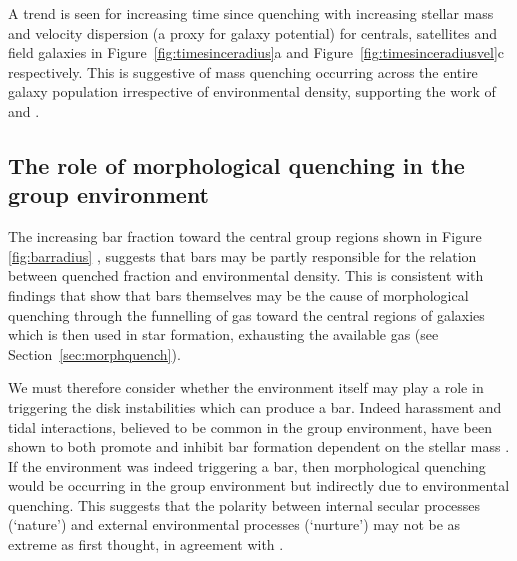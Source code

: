 \documentclass[useAMS,usenatbib]{mn2e}
\begin{document}
A trend is seen for increasing time since quenching with increasing stellar mass and velocity dispersion (a proxy for galaxy potential) for centrals, satellites and field galaxies in Figure~\ref{fig:timesinceradius}a and Figure~\ref{fig:timesinceradiusvel}c respectively. This is suggestive of mass quenching occurring across the entire galaxy population irrespective of environmental density, supporting the work of \citet{peng10, peng12, Gabor10} and \citet{darvish16}.

\subsection{The role of morphological quenching in the group environment}\label{sec:rolemorphenv}

The increasing bar fraction toward the central group regions shown in Figure \ref{fig:barradius} \citep[in agreement with][]{skibba12}, suggests that bars may be partly responsible for the relation between quenched fraction and environmental density. This is consistent with findings that show that bars themselves may be the cause of morphological quenching through the funnelling of gas toward the central regions of galaxies \citep{athanassoula92b, sheth05} which is then used in star formation, exhausting the available gas (see Section~\ref{sec:morphquench}).


We must therefore consider whether the environment itself may play a role in triggering the disk instabilities which can produce a bar. Indeed harassment and tidal interactions, believed to be common in the group environment, have been shown to both promote and inhibit bar formation dependent on the stellar mass \citep{noguchi88, moore96, skibba12}.  If the environment was indeed triggering a bar, then morphological quenching would be occurring in the group environment but indirectly due to environmental quenching. This suggests that the polarity between internal secular processes (`nature') and external environmental processes (`nurture') may not be as extreme as first thought, in agreement with \cite{skibba12}. 
\end{document}
